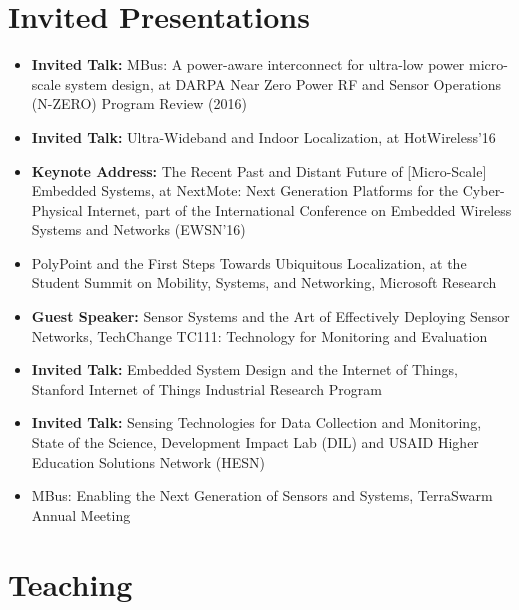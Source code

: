 \documentclass{article}
\begin{document}
\section*{Invited Presentations}

\begin{itemize}
  \item[] \textbf{Invited Talk:} MBus: A power-aware interconnect for ultra-low power micro-scale system design, at DARPA Near Zero Power RF and Sensor Operations (N-ZERO) Program Review (2016)
  \item[] \textbf{Invited Talk:} Ultra-Wideband and Indoor Localization, at HotWireless'16
  \item[] \textbf{Keynote Address:} The Recent Past and Distant Future of [Micro-Scale] Embedded Systems, at NextMote: Next Generation Platforms for the Cyber-Physical Internet,
    part of the International Conference on Embedded Wireless Systems and Networks (EWSN'16)
  \item[] PolyPoint and the First Steps Towards Ubiquitous Localization, at the Student Summit on Mobility, Systems, and Networking, Microsoft Research
  \item[] \textbf{Guest Speaker:} Sensor Systems and the Art of Effectively Deploying Sensor Networks, TechChange TC111: Technology for Monitoring and Evaluation
  \item[] \textbf{Invited Talk:} Embedded System Design and the Internet of Things, Stanford Internet of Things Industrial Research Program
  \item[] \textbf{Invited Talk:} Sensing Technologies for Data Collection and Monitoring, State of the Science, Development Impact Lab (DIL) and USAID Higher Education Solutions Network (HESN)
  \item[] MBus: Enabling the Next Generation of Sensors and Systems, TerraSwarm Annual Meeting
\end{itemize}

\section*{Teaching}
\end{document}
